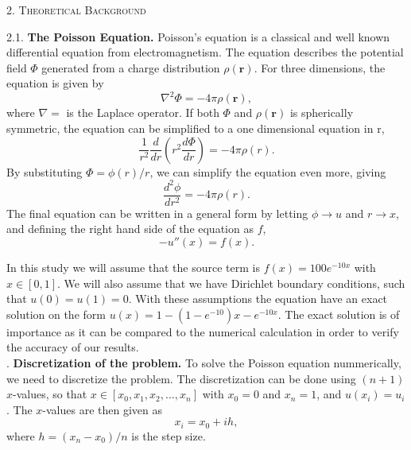 \documentclass[a4paper,10pt]{article}
\newcommand{\der}[2]{\frac{d #1}{d #2}}
\newcommand{\dder}[2]{\frac{d^2 #1}{d #2 ^2}}
\begin{document}
\newpage


\begin{center}
\textsc{2. Theoretical Background}
\end{center}
2.1. \textbf{The Poisson Equation.} 
Poisson's equation is a classical and well known differential equation from electromagnetism. The equation describes the potential field $\Phi$ generated from a charge distribution $\rho(\textbf{r})$. For three dimensions, the equation is given by
\begin{equation}\label{eq:1}
 \nabla^2 \Phi = -4 \pi \rho(\textbf{r}),
\end{equation}
where $\nabla = $ is the Laplace operator. If both $\Phi$ and $\rho(\textbf{r})$ is spherically symmetric, the equation can be simplified to a one dimensional equation in r,
$$ \frac{1}{r^2}  \der{}{r} \left( r^2 \der{\Phi}{r} \right)= -4 \pi \rho(r).$$
By substituting $\Phi = \phi(r)/r$, we can simplify the equation even more, giving 
$$ \dder{\phi}{r} = -4\pi \rho(r). $$ 
The final equation can be written in a general form by letting $\phi \rightarrow u$ and $r \rightarrow x$, and defining the right hand side of the equation as $f$,
\begin{equation}\label{eq:2}
 - u''(x) = f(x).
\end{equation}

In this study we will assume that the source term is $f(x) = 100 e^{-10x}$ with $x \in [0,1]$. We will also assume that we have Dirichlet boundary conditions, such that $ u(0) = u(1) = 0. $ With these assumptions the equation have an exact solution on the form $u(x) = 1 - (1 - e^{-10})x - e^{-10x}$. The exact solution is of importance as it can be compared to the numerical calculation in order to verify the accuracy of our results.  \\



. \textbf{Discretization of the problem.} 
To solve the Poisson equation nummerically, we need to discretize the problem. The discretization can be done using $(n+1)$ $x$-values, so that $x \in [x_0, x_1, x_2, ..., x_n]$ with $x_0 = 0$ and $x_n = 1$, and $u(x_i) = u_i$. The $x$-values are then given as 
$$ x_i = x_0 + ih, $$
where $h = (x_n - x_0)/n$ is the step size. \\
\end{document}
